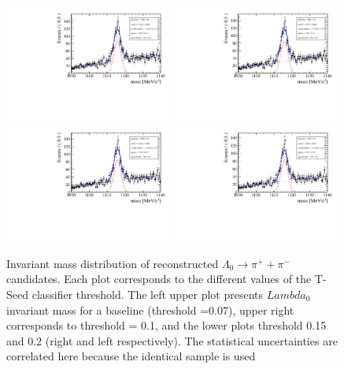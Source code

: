 \begin{figure}[tbph]
\begin{center}
\includegraphics[rotate=-90, width = 0.49\textwidth]{figures/tracking_ks/Mass_lambda_bdt.pdf} 
\includegraphics[rotate=-90, width = 0.49\textwidth]{figures/tracking_ks/mas_labda_bdt_01.pdf} \\
\includegraphics[rotate=-90, width = 0.49\textwidth]{figures/tracking_ks/mas_labda_bdt_015.pdf}
\includegraphics[rotate=-90, width = 0.49\textwidth]{figures/tracking_ks/mas_labda_bdt_02.pdf}

\caption{Invariant mass distribution of reconstructed  $\Lambda_0 \rightarrow \pi^{+} + \pi^{-}$ candidates. Each plot corresponds to the different values of the T-Seed classifier threshold. The left upper plot presents  $Lambda_0$ invariant mass for a baseline (threshold =0.07), upper right corresponds to threshold = 0.1, and the lower plots threshold 0.15 and 0.2 (right and left respectively). The statistical uncertainties are correlated here because the identical sample is used }
\label{fig:Lambda_finetuning}
 \end{center}
 \end{figure}



